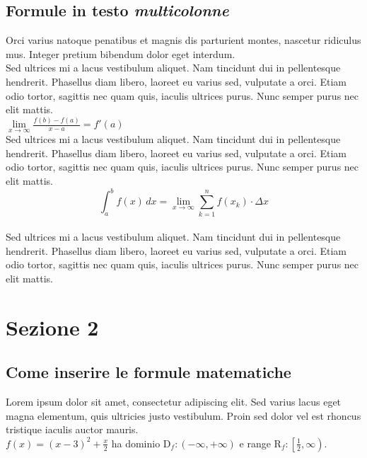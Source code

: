 \documentclass[11pt, landscape]{article}
\begin{document}
\begin{multicols}{2}

\subsection{Formule in testo \emph{multicolonne}}
Orci varius natoque penatibus et magnis dis parturient montes, nascetur ridiculus mus. Integer pretium bibendum dolor eget interdum.\\
Sed ultrices mi a lacus vestibulum aliquet. Nam tincidunt dui in pellentesque hendrerit. Phasellus diam libero, laoreet eu varius sed, vulputate a orci. Etiam odio tortor, sagittis nec quam quis, iaculis ultrices purus. Nunc semper purus nec elit mattis.\\[3mm]
$\displaystyle{\lim \limits_{x \to \infty} \frac{f(b)-f(a)}{x-a}=f'(a)}$\\[3mm]
Sed ultrices mi a lacus vestibulum aliquet. Nam tincidunt dui in pellentesque hendrerit. Phasellus diam libero, laoreet eu varius sed, vulputate a orci. Etiam odio tortor, sagittis nec quam quis, iaculis ultrices purus. Nunc semper purus nec elit mattis.\\
\begin{equation}
	\displaystyle{\int_a^b{f(x) \,dx=\lim \limits_{x \to \infty} \sum \limits_{k=1}^{n}f(x_k) \cdot \Delta x}}
\end{equation}\\
Sed ultrices mi a lacus vestibulum aliquet. Nam tincidunt dui in pellentesque hendrerit. Phasellus diam libero, laoreet eu varius sed, vulputate a orci. Etiam odio tortor, sagittis nec quam quis, iaculis ultrices purus. Nunc semper purus nec elit mattis.\\[1.5mm]
\end{multicols}


\section{Sezione 2}

\subsection{Come inserire le formule matematiche}
Lorem ipsum dolor sit amet, consectetur adipiscing elit. Sed varius lacus eget magna elementum, quis ultricies justo vestibulum. Proin sed dolor vel est rhoncus tristique iaculis auctor mauris.\\[3mm]
$f(x)=(x-3)^2+ \displaystyle \frac{x}{2}$ ha dominio $\mathrm{D}_f:(-\infty,+\infty)$
e range $\mathrm{R}_f:\left[\frac{1}{2},\infty\right)$.\\
\end{document}

